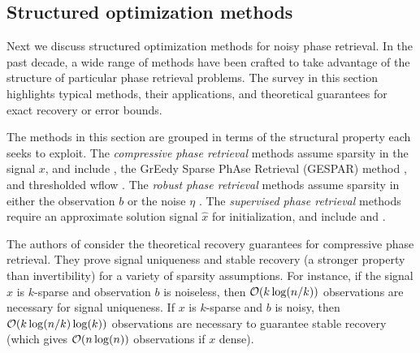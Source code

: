\subsection{Structured optimization methods}  	\label{Subsubsec:phase_retrieval-structured}


Next we discuss structured optimization methods for noisy phase retrieval.  In the past decade, a wide range of methods have been crafted to take advantage of the structure of particular phase retrieval problems.  The survey in this section highlights typical methods, their applications, and theoretical guarantees for exact recovery or error bounds.  


The methods in this section are grouped in terms of the structural property each seeks to exploit.  
The \textit{compressive phase retrieval} methods assume sparsity in the signal $x$, and include \cite{DBLP:journals/corr/abs-1104-4406}, the GrEedy Sparse PhAse Retrieval (GESPAR) method \cite{shechtman2014gespar}, and thresholded wflow  \cite{cai2016optimal}.
The \textit{robust phase retrieval} methods assume sparsity in either the observation $b$ \cite{katkovnik2017phase} or the noise $\eta$ \cite{jiang2017robust}.
The \textit{supervised phase retrieval} methods require an approximate solution signal $\hat{x}$ for initialization, and include \cite{goldstein2018phasemax} and \cite{bahmani2016phase}.



The authors of \cite{DBLP:journals/corr/abs-1211-0872} consider the theoretical recovery guarantees for compressive phase retrieval.
They prove signal uniqueness and stable recovery (a stronger property than invertibility) for a variety of sparsity assumptions.  
For instance, if the signal $x$ is $k$-sparse and observation $b$ is noiseless, then ${\mathcal O}(k \log(n/k))$ observations are necessary for signal uniqueness.  
If $x$ is $k$-sparse and $b$ is noisy, then ${\mathcal O}(k \log(n/k) \log(k))$ observations are necessary to guarantee stable recovery (which gives ${\mathcal O}(n \log(n))$ observations if $x$ dense).


